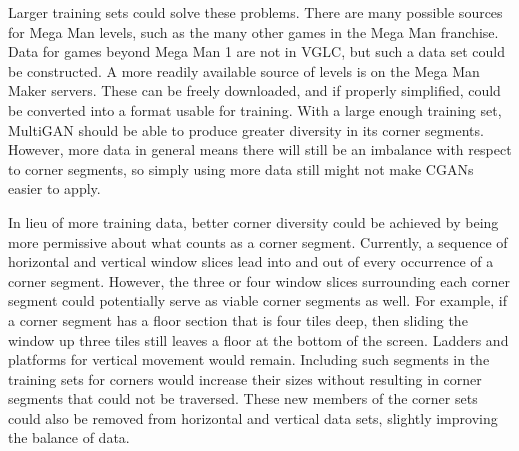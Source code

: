 

Larger training sets could solve these problems.
There are many possible sources for Mega Man levels, such as the many other games in the Mega Man franchise. %
Data for games beyond Mega Man 1 are not in VGLC, but such a data set could be constructed. A more readily available source of levels is on the Mega Man Maker servers. These can be freely downloaded, and if properly simplified, could be converted into a format usable for training.
With a large enough training set, MultiGAN should be able to produce greater diversity in its corner segments. However, more data in general means there will still be an imbalance with respect to corner segments, so simply using more data still might not make CGANs easier to apply.

In lieu of more training data, better corner diversity could be achieved by being more permissive about what counts as a corner segment. Currently, a sequence of horizontal and vertical window slices lead into and out of every occurrence of a corner segment. However, the three or four window slices surrounding each corner segment could potentially serve as viable corner segments as well. For example, if a corner segment has a floor section that is four tiles deep, then sliding the window up three tiles still leaves a floor at the bottom of the screen. Ladders and platforms for vertical movement would remain. Including such segments in the training sets for corners would increase their sizes without resulting in corner segments that could not be traversed. These new members of the corner sets could also be removed from horizontal and vertical data sets, slightly improving the balance of data. 

